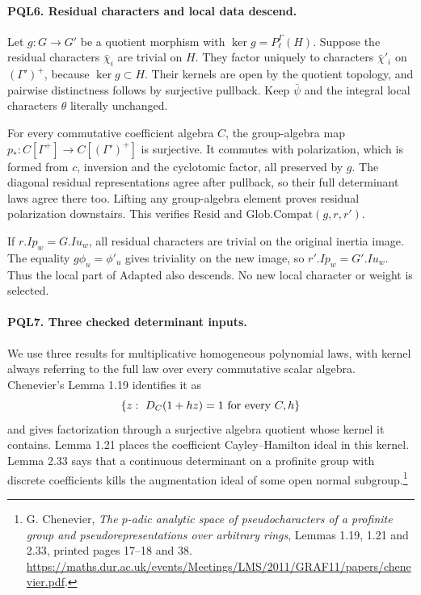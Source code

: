\paragraph{PQL6. Residual characters and local data descend.}
\label{claim:PQL6}
Let \(g:G\to G'\) be a quotient morphism with
\(\ker g=P_\ell^\Gamma(H)\). Suppose the residual characters
\(\bar\chi_i\) are trivial on \(H\). They factor uniquely
to characters \(\bar\chi'_i\) on \((\Gamma')^+\), because
\(\ker g\subset H\). Their kernels are open by the quotient
topology, and pairwise distinctness follows by surjective
pullback. Keep \(\bar\psi\) and the integral local characters
\(\theta\) literally unchanged.

For every commutative coefficient algebra \(C\), the
group-algebra map \(p_*:C[\Gamma^+]\to C[(\Gamma')^+]\)
is surjective. It commutes with polarization, which is
formed from \(c\), inversion and the cyclotomic factor,
all preserved by \(g\). The diagonal residual
representations agree after pullback, so their full
determinant laws agree there too. Lifting any group-algebra
element proves residual polarization downstairs.
This verifies \(\mathrm{Resid}\) and
\(\mathrm{Glob.Compat}(g,r,r')\).

If \(r.Ip_w=G.Iu_w\), all residual characters are trivial
on the original inertia image. The equality
\(g\phi_u=\phi'_u\) gives triviality on the new image,
so \(r'.Ip_w=G'.Iu_w\). Thus the local part of
\(\mathrm{Adapted}\) also descends. No new local
character or weight is selected.

\paragraph{PQL7. Three checked determinant inputs.}\label{claim:PQL7}
We use three results for multiplicative homogeneous polynomial
laws, with kernel always referring to the full law over every
commutative scalar algebra. Chenevier's Lemma 1.19 identifies it as
\[
 \{z:\ D_C(1+hz)=1\ \hbox{for every }C,h\}
\]
and gives factorization through a surjective algebra quotient
whose kernel it contains. Lemma 1.21 places the coefficient
Cayley--Hamilton ideal in this kernel. Lemma 2.33 says that a
continuous determinant on a profinite group with discrete
coefficients kills the augmentation ideal of some open
normal subgroup.\footnote{G. Chenevier,
\emph{The \(p\)-adic analytic space of pseudocharacters of a
profinite group and pseudorepresentations over arbitrary rings},
Lemmas 1.19, 1.21 and 2.33, printed pages 17--18 and 38.
\url{https://maths.dur.ac.uk/events/Meetings/LMS/2011/GRAF11/papers/chenevier.pdf}.}

